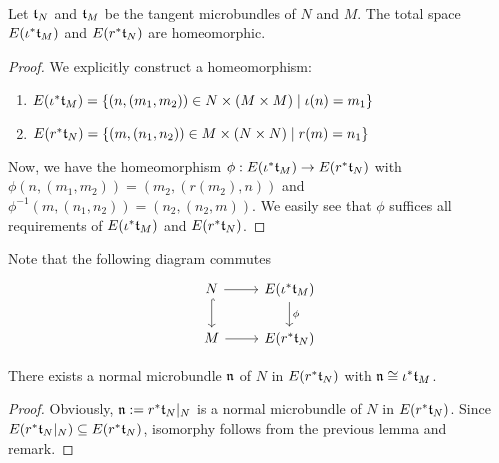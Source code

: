  \\
Let $\mathfrak{t}_N$ and $\mathfrak{t}_M$ be the tangent microbundles of $N$ and $M$.
The total space $E(\iota^*\mathfrak{t}_M)$ and $E(r^*\mathfrak{t}_N)$ are homeomorphic.
\begin{proof}
We explicitly construct a homeomorphism:
\begin{enumerate}
    \item $E(\iota^*\mathfrak{t}_M) = \{ (n, (m_1, m_2)) \in N \times (M \times M) \mid \iota(n) = m_1\}$
    \item $E(r^*\mathfrak{t}_N) = \{ (m, (n_1, n_2)) \in M \times (N \times N) \mid r(m) = n_1\}$
\end{enumerate}
Now, we have the homeomorphism $\phi: E(\iota^*\mathfrak{t}_M) \to E(r^*\mathfrak{t}_N)$ with
$\phi(n, (m_1, m_2)) = (m_2, (r(m_2), n))$ and $\phi^{-1}(m, (n_1, n_2)) = (n_2, (n_2, m))$.
We easily see that $\phi$ suffices all requirements of $E(\iota^*\mathfrak{t}_M)$ and $E(r^*\mathfrak{t}_N)$.
\end{proof}

\begin{remark}
Note that the following diagram commutes
\[\begin{tikzcd}
    N \ar[r] \ar[hookrightarrow]{d} & E(\iota^*\bt_M) \ar[d, "\phi"] \\
    M \ar[r] & E(r^*\bt_N)
\end{tikzcd}\]
\end{remark}

There exists a normal microbundle $\mathfrak{n}$ of $N$ in $E(r^*\mathfrak{t}_N)$ with $\mathfrak{n} \cong \iota^*\mathfrak{t}_M$.
\begin{proof}
Obviously, $\mathfrak{n} := r^*\mathfrak{t}_N \vert_{N}$ is a normal microbundle of $N$ in $E(r^*\mathfrak{t}_N)$.
Since $E(r^*\mathfrak{t}_N \vert_{N}) \subseteq E(r^*\mathfrak{t}_N)$, isomorphy follows from the previous lemma and remark.
\end{proof}